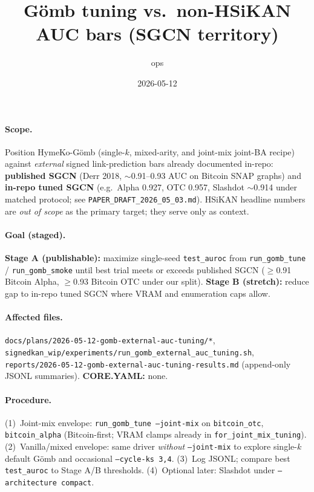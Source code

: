 \documentclass{article}
\title{G\"omb tuning vs.\ non-HSiKAN AUC bars (SGCN territory)}
\author{ops}
\date{2026-05-12}
\begin{document}
\maketitle

\paragraph{Scope.}
Position HymeKo-G\"omb (single-$k$, mixed-arity, and joint-mix joint-BA
recipe) against \emph{external} signed link-prediction bars already
documented in-repo: \textbf{published SGCN} (Derr 2018, $\sim$0.91--0.93
AUC on Bitcoin SNAP graphs) and \textbf{in-repo tuned SGCN} (e.g.\ Alpha
0.927, OTC 0.957, Slashdot $\sim$0.914 under matched protocol; see
\texttt{PAPER\_DRAFT\_2026\_05\_03.md}).  HSiKAN headline numbers are
\emph{out of scope} as the primary target; they serve only as context.

\paragraph{Goal (staged).}
\textbf{Stage A (publishable):} maximize single-seed \texttt{test\_auroc}
from \texttt{run\_gomb\_tune} / \texttt{run\_gomb\_smoke} until best trial
meets or exceeds published SGCN ($\geq$0.91 Bitcoin Alpha, $\geq$0.93
Bitcoin OTC under our split).  \textbf{Stage B (stretch):} reduce gap to
in-repo tuned SGCN where VRAM and enumeration caps allow.

\paragraph{Affected files.}
\texttt{docs/plans/2026-05-12-gomb-external-auc-tuning/*},
\texttt{signedkan\_wip/experiments/run\_gomb\_external\_auc\_tuning.sh},
\texttt{reports/2026-05-12-gomb-external-auc-tuning-results.md} (append-only
JSONL summaries).  \textbf{CORE.YAML:} none.

\paragraph{Procedure.}
(1)~Joint-mix envelope: \texttt{run\_gomb\_tune --joint-mix} on
\texttt{bitcoin\_otc}, \texttt{bitcoin\_alpha} (Bitcoin-first; VRAM
clamps already in \texttt{for\_joint\_mix\_tuning}).  (2)~Vanilla/mixed
envelope: same driver \emph{without} \texttt{--joint-mix} to explore
single-$k$ default G\"omb and occasional \texttt{--cycle-ks 3,4}.
(3)~Log JSONL; compare best \texttt{test\_auroc} to Stage A/B thresholds.
(4)~Optional later: Slashdot under \texttt{--architecture compact}.
\end{document}
